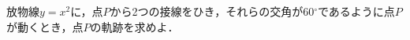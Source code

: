\documentclass[../../main.tex]{subfiles}
\begin{document}
放物線$y=x^2$に，点$P$から2つの接線をひき，それらの交角が60$^\circ$であるように点$P$が動くとき，点$P$の軌跡を求めよ．
\end{document}
